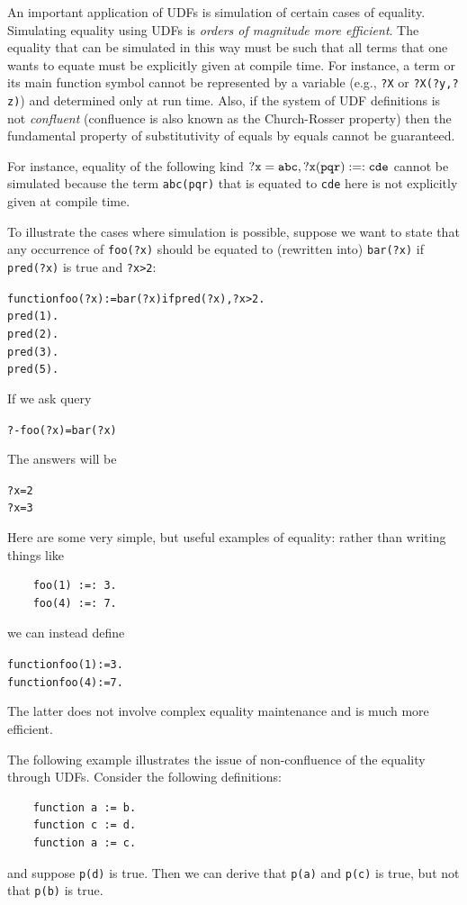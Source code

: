 \documentclass[11pt]{article}
\begin{document}
An important application of UDFs is simulation of certain cases of
equality.
Simulating equality using UDFs is \emph{orders of magnitude more
  efficient}.  
The equality that can be simulated in this way must be such
that all terms that one wants to equate must be explicitly given at
compile time. For instance, a term or its main function symbol cannot be
represented by a variable (e.g., \texttt{?X} or \texttt{?X(?y,?z)})  and
determined only at run time.
Also, if the system of UDF definitions is not \emph{confluent} 
(confluence is also known as the Church-Rosser property) then
the fundamental property of
substitutivity of equals by equals cannot be guaranteed.


For instance, equality of the following kind $\tt ?x=abc, ?x(pqr) :=: cde$
cannot be simulated because the term \texttt{abc(pqr)} that is equated to
\texttt{cde} here is not explicitly given at compile time.  

To illustrate the cases where simulation is possible, suppose we want to
state that any occurrence of \texttt{foo(?x)} should be equated to (rewritten
into) \texttt{bar(?x)} if \texttt{pred(?x)} is true and \texttt{?x>2}: 
\begin{alltt}
    function foo(?x):=bar(?x) if  pred(?x), ?x>2.
    pred(1).
    pred(2).
    pred(3).
    pred(5).
\end{alltt}

If we ask query
\begin{alltt}
    ?- foo(?x)=bar(?x)
\end{alltt}
The answers will be
\begin{alltt}
    ?x=2
    ?x=3
\end{alltt}


Here are some very simple, but useful examples of equality: rather than
writing things like
\begin{verbatim}
    foo(1) :=: 3.
    foo(4) :=: 7.
\end{verbatim}
we can instead define
\begin{alltt}
    function foo(1):=3.
    function foo(4):=7.
\end{alltt}
The latter does not involve complex equality maintenance and is much more
efficient.

The following example illustrates the issue of non-confluence of the
equality through UDFs. Consider the following definitions:
\begin{verbatim}
    function a := b.
    function c := d.
    function a := c.
\end{verbatim}
and suppose \texttt{p(d)} is true. Then we can derive that \texttt{p(a)}
and \texttt{p(c)} is true, but not that \texttt{p(b)} is true.    
\end{document}
